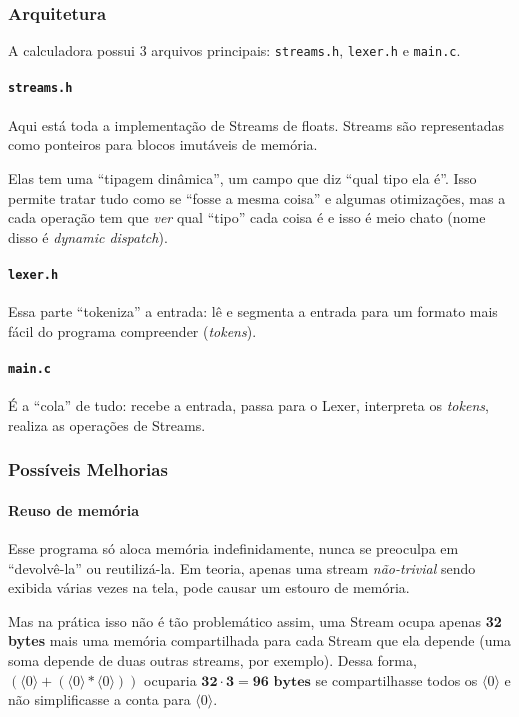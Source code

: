 \documentclass{article}
\newcommand{\ins}[1]{\langle #1 \rangle}
\begin{document}
\subsubsection{Arquitetura}

A calculadora possui 3 arquivos principais:
\texttt{streams.h}, \texttt{lexer.h} e \texttt{main.c}.

\paragraph{\texttt{streams.h}}

Aqui está toda a implementação de Streams de floats.
Streams são representadas como ponteiros para blocos imutáveis
de memória.

Elas tem uma ``tipagem dinâmica'',
um campo que diz ``qual tipo ela é''.
Isso permite tratar tudo como se ``fosse a mesma coisa''
e algumas otimizações,
mas a cada operação tem que \emph{ver} qual
``tipo'' cada coisa é e isso é meio chato
(nome disso é \emph{dynamic dispatch}).

\paragraph{\texttt{lexer.h}}

Essa parte ``tokeniza'' a entrada:
lê e segmenta a entrada
para um formato mais fácil do
programa compreender (\emph{tokens}).

\paragraph{\texttt{main.c}}

É a ``cola'' de tudo:
recebe a entrada,
passa para o Lexer,
interpreta os \emph{tokens},
realiza as operações de Streams.

\subsubsection{Possíveis Melhorias}
\paragraph{Reuso de memória}

Esse programa só aloca memória indefinidamente,
nunca se preoculpa em ``devolvê-la'' ou reutilizá-la.
Em teoria, apenas uma stream \emph{não-trivial}
sendo exibida várias vezes na tela,
pode causar um estouro de memória.

Mas na prática isso não é tão problemático assim,
uma Stream ocupa apenas \textbf{32 bytes}
mais uma memória compartilhada para cada
Stream que ela depende
(uma soma depende de duas outras streams,
por exemplo).
Dessa forma, \((\ins{0} + (\ins{0} * \ins{0}))\)
ocuparia \(\mathbf{32 \cdot 3 = 96} \textbf{ bytes}\)
se compartilhasse todos os \(\ins{0}\)
e não simplificasse a conta para \(\ins{0}\).
\end{document}
